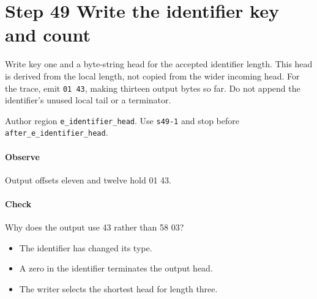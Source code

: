 \section{Step 49 Write the identifier key and count}\label{cbor-s49}
Write key one and a byte-string head for the accepted identifier length. This head is derived from the local length, not copied from the wider incoming head. For the trace, emit \texttt{01 43}, making thirteen output bytes so far. Do not append the identifier's unused local tail or a terminator.

Author region \texttt{e\_identifier\_head}. Use \texttt{s49-1} and stop before \texttt{after\_e\_identifier\_head}.

\paragraph{Observe} Output offsets eleven and twelve hold 01 43.

\paragraph{Check} Why does the output use 43 rather than 58 03?
\begin{itemize}
  \item[A.] The identifier has changed its type.
  \item[B.] A zero in the identifier terminates the output head.
  \item[C.] The writer selects the shortest head for length three.
\end{itemize}
